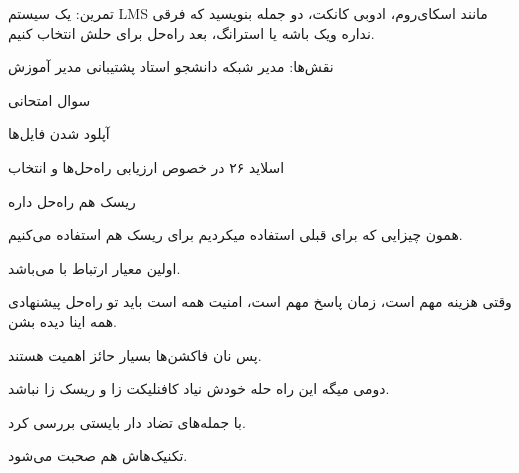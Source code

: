 تمرین: یک سیستم LMS مانند اسکای‌روم، ادوبی کانکت، دو جمله بنویسید که فرقی نداره
ویک باشه یا استرانگ، بعد راه‌حل برای حلش انتخاب کنیم.

نقش‌ها:
مدیر شبکه
دانشجو
استاد
پشتیبانی
مدیر آموزش

سوال امتحانی

آپلود شدن فایل‌ها

اسلاید ۲۶ در خصوص ارزیابی راه‌حل‌ها و انتخاب

ریسک هم راه‌حل داره

همون چیزایی که برای قبلی استفاده میکردیم برای ریسک هم استفاده می‌کنیم.

اولین معیار ارتباط با  می‌باشد.

وقتی هزینه مهم است، زمان پاسخ مهم است، امنیت همه است 
باید تو راه‌حل پیشنهادی همه اینا دیده بشن.

پس نان فاکشن‌ها بسیار حائز اهمیت هستند.

دومی میگه این راه حله خودش نیاد کافنلیکت زا و ریسک زا نباشد.

با جمله‌های تضاد دار بایستی بررسی کرد.

تکنیک‌هاش هم صحبت می‌شود.
